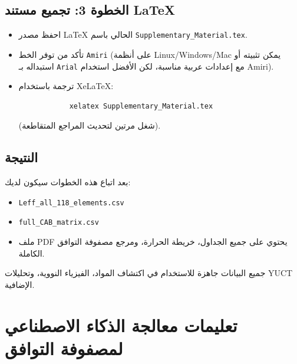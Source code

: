 \documentclass[12pt,a4paper]{article}
\begin{document}
	\subsection*{الخطوة 3: تجميع مستند LaTeX}
	\begin{itemize}
		\item احفظ مصدر LaTeX الحالي باسم \texttt{Supplementary\_Material.tex}.
		\item تأكد من توفر الخط \texttt{Amiri} (على أنظمة Linux/Windows/Mac يمكن تثبيته أو استبداله بـ \texttt{Arial} مع إعدادات عربية مناسبة، لكن الأفضل استخدام Amiri).
		\item ترجمة باستخدام XeLaTeX: 
		\begin{verbatim}
			xelatex Supplementary_Material.tex
		\end{verbatim}
		(شغل مرتين لتحديث المراجع المتقاطعة).
	\end{itemize}
	
	\subsection*{النتيجة}
	بعد اتباع هذه الخطوات سيكون لديك:
	\begin{itemize}
		\item \texttt{Leff\_all\_118\_elements.csv}
		\item \texttt{full\_CAB\_matrix.csv}
		\item ملف PDF يحتوي على جميع الجداول، خريطة الحرارة، ومرجع مصفوفة التوافق الكاملة.
	\end{itemize}
	جميع البيانات جاهزة للاستخدام في اكتشاف المواد، الفيزياء النووية، وتحليلات YUCT الإضافية.
	
	\section*{تعليمات معالجة الذكاء الاصطناعي لمصفوفة التوافق}
	\label{sec:ai_instructions}
	
\end{document}
